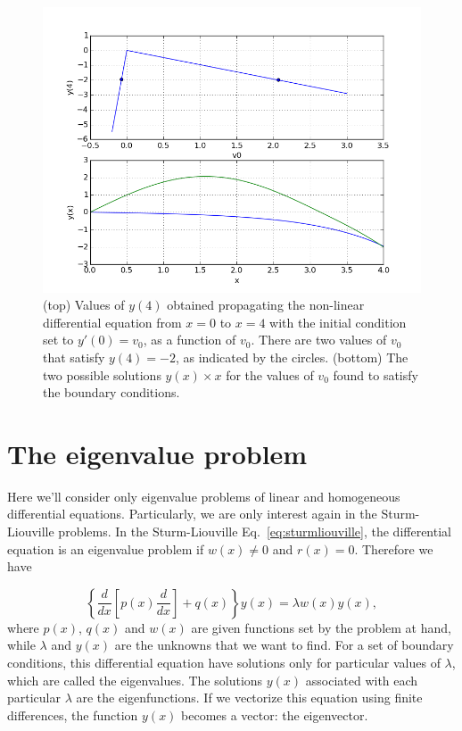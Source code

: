 \begin{figure}[ht!]
 \centering
 \includegraphics[width=0.70\columnwidth]{./shooting.png}
 \caption{(top) Values of $y(4)$ obtained propagating the non-linear differential equation from $x=0$ to $x=4$ with the initial condition set to $y'(0) = v_0$, as a function of $v_0$. There are two values of $v_0$ that satisfy $y(4) = -2$, as indicated by the circles.
 (bottom) The two possible solutions $y(x) \times x$ for the values of $v_0$ found to satisfy the boundary conditions. }
 \label{fig:shooting}
\end{figure}

\section{The eigenvalue problem}

Here we'll consider only eigenvalue problems of linear and homogeneous differential equations. Particularly, we are only interest again in the Sturm-Liouville problems. In the Sturm-Liouville Eq.~\eqref{eq:sturmliouville}, the differential equation is an eigenvalue problem if $w(x) \neq 0$ and $r(x) = 0$. Therefore we have

\begin{equation}
 \left\{\dfrac{d}{dx}\left[p(x) \dfrac{d}{dx}\right] + q(x)\right\}y(x) = \lambda w(x)y(x),
\end{equation}
where $p(x)$, $q(x)$ and $w(x)$ are given functions set by the problem at hand, while $\lambda$ and $y(x)$ are the unknowns that we want to find. For a set of boundary conditions, this differential equation have solutions only for particular values of $\lambda$, which are called the eigenvalues. The solutions $y(x)$ associated with each particular $\lambda$ are the eigenfunctions. If we vectorize this equation using finite differences, the function $y(x)$ becomes a vector: the eigenvector.

